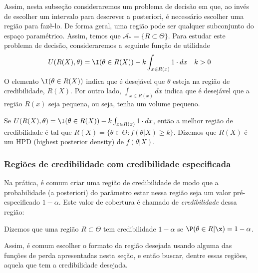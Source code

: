 Assim, nesta subseção consideraremos 
um problema de decisão em que,
ao invés de escolher um intervalo para 
descrever a posteriori,
é necessário escolher uma região para fazê-lo.
De forma geral, uma região pode ser 
qualquer subconjunto do espaço paramétrico.
Assim, temos que
$\mathcal{A}_{*} = \{R \subset \Theta\}$.
Para estudar este problema de decisão,
consideraremos a seguinte função de utilidade
\begin{align*}
U(R(X),\theta)	
&= \I(\theta \in R(X)) 
-k\int_{x \in R(x)}{1 \cdot dx}
& k > 0
\end{align*}
O elemento $\I(\theta \in R(X))$ indica que 
é desejável que $\theta$ esteja 
na região de credibilidade, $R(X)$.
Por outro lado,  $\int_{x \in R(x)}{dx}$ indica que
é desejável que a região $R(x)$ seja pequena, 
ou seja, tenha um volume pequeno.
\begin{theorem}
\label{thm:hpd}
Se $U(R(X),\theta)	= \I(\theta \in R(X)) - k\int_{x \in R(x)}{1 \cdot dx}$, então 
a melhor região de credibilidade é tal que 
$R(X) = \{\theta \in \Theta: f(\theta|X) \geq k\}$.
Dizemos que $R(X)$ é um HPD (highest posterior density) 
de $f(\theta|X)$.
\end{theorem}


\subsubsection{Regiões de credibilidade com credibilidade especificada}
\label{sec:credibilidade}


Na prática, é comum criar uma região de credibilidade
de modo que a probabilidade (a posteriori) do parâmetro estar nessa região
seja um valor pré-especificado $1-\alpha$. Este valor de cobertura é chamado de 
\emph{credibilidade} dessa região:
\begin{definition}
Dizemos que uma região $R \subset \Theta$ tem credibilidade $1-\alpha$
se $\P(\theta \in R|\x)=1-\alpha$.
\end{definition}

Assim, é comum escolher o formato da região desejada usando 
alguma das funções de perda apresentadas nesta seção, e então buscar, dentre essas regiões,
aquela que tem a credibilidade desejada.

